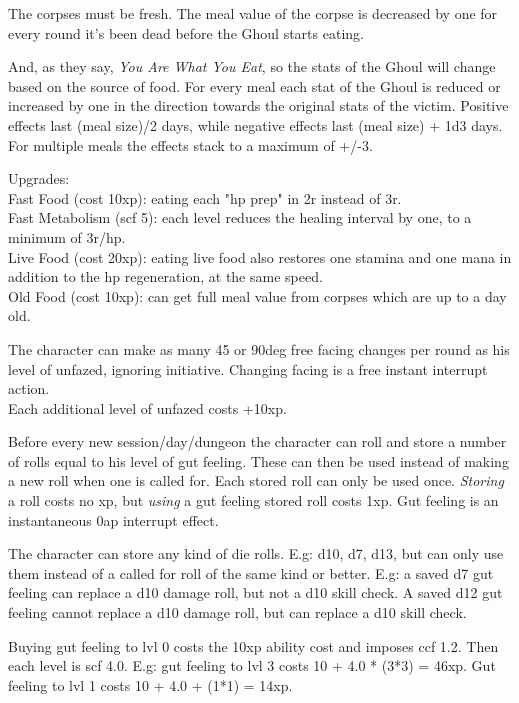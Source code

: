 The corpses must be fresh. The meal value of the corpse is decreased by one for every round it's been dead before the Ghoul starts eating.

And, as they say, \emph{You Are What You Eat}, so the stats of the Ghoul will change based on the source of food. For every meal each stat of the Ghoul is reduced or increased by one in the direction towards the original stats of the victim. Positive effects last (meal size)/2 days, while negative effects last (meal size) + 1d3 days. For multiple meals the effects stack to a maximum of +/-3.

Upgrades:\\
Fast Food (cost 10xp): eating each "hp prep" in 2r instead of 3r.\\
Fast Metabolism (scf 5): each level reduces the healing interval by one, to a minimum of 3r/hp.\\
Live Food (cost 20xp): eating live food also restores one stamina and one mana in addition to the hp regeneration, at the same speed.\\
Old Food (cost 10xp): can get full meal value from corpses which are up to a day old.


 The character can make as many 45 or 90deg free facing changes per round as his level of unfazed, ignoring initiative. Changing facing is a free instant interrupt action.\\
Each additional level of unfazed costs +10xp.


 Before every new session/day/dungeon the character can roll and store a number of rolls equal to his level of gut feeling. These can then be used instead of making a new roll when one is called for. Each stored roll can only be used once. \emph{Storing} a roll costs no xp, but \emph{using} a gut feeling stored roll costs 1xp. Gut feeling is an instantaneous 0ap interrupt effect.

The character can store any kind of die rolls. E.g: d10, d7, d13, but can only use them instead of a called for roll of the same kind or better. E.g: a saved d7 gut feeling can replace a d10 damage roll, but not a d10 skill check. A saved d12 gut feeling cannot replace a d10 damage roll, but can replace a d10 skill check.

Buying gut feeling to lvl 0 costs the 10xp ability cost and imposes ccf 1.2. Then each level is scf 4.0. E.g: gut feeling to lvl 3 costs 10 + 4.0 * (3*3) = 46xp. Gut feeling to lvl 1 costs 10 + 4.0 + (1*1) = 14xp.





